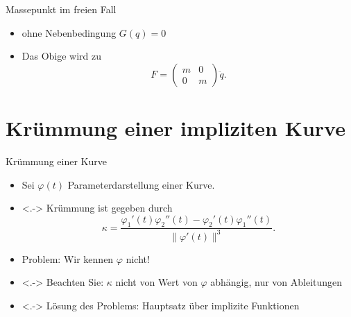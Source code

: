 \documentclass[aspectratio=169]{beamer}
\begin{document}
\begin{frame}{Massepunkt im freien Fall}
\begin{itemize}
    \item ohne Nebenbedingung $G(q)=0$
    \item Das Obige wird zu
        \begin{equation*}
            F = \begin{pmatrix}
            m & 0 \\
            0 & m
            \end{pmatrix} \ddot{q}.
        \end{equation*}
\end{itemize}
\end{frame}

\section{Krümmung einer impliziten Kurve}

\begin{frame}{Krümmung einer Kurve}
\begin{itemize}[<+->]
    \item Sei $\varphi (t)$ Parameterdarstellung einer Kurve.
    \item<.-> Krümmung ist gegeben durch
        \begin{equation*}
        \kappa = \frac{\varphi_1'(t) \varphi_2''(t) - \varphi_2'(t) \varphi_1''(t)}{\| \varphi '(t) \|^3}.
        \end{equation*}
    \item Problem: Wir kennen $\varphi$ nicht!
    \item<.-> Beachten Sie: $\kappa$ nicht von Wert von $\varphi$ abhängig,
        nur von Ableitungen
    \item<.-> Lösung des Problems: Hauptsatz über implizite Funktionen
\end{itemize}
\end{frame}
\end{document}
